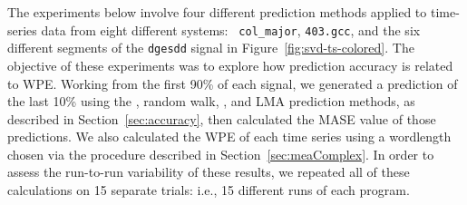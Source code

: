 The experiments below involve four different prediction methods
applied to time-series data from eight different systems: {\tt
  col\_major}, {\tt 403.gcc}, and the six different segments of the
{\tt dgesdd} signal in Figure~\ref{fig:svd-ts-colored}.  The objective
of these experiments was to explore how prediction accuracy is related
to WPE.
%
%
Working from the first 90\% of each signal, we generated a prediction
of the last 10\% using the \naive, random walk, \arima, and LMA prediction methods,
as described in Section~\ref{sec:accuracy}, then calculated the MASE
value of those predictions.  We also calculated the WPE of each time
series using a wordlength chosen via the procedure described in
Section~\ref{sec:meaComplex}.  In order to assess the run-to-run
variability of these results, we repeated all of these calculations on
15 separate trials: i.e., 15 different runs of each program.


